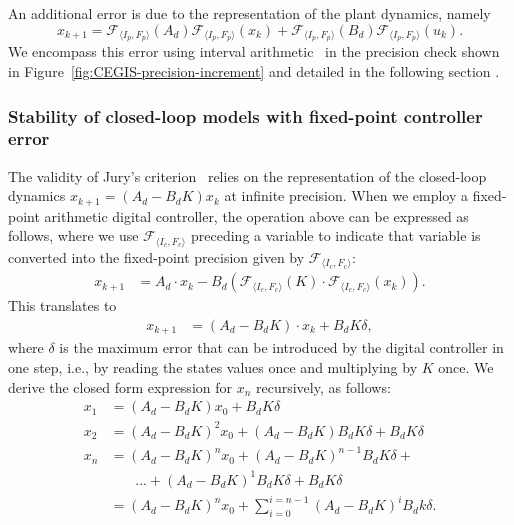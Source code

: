 An additional error is due to the representation of the plant dynamics, namely 
%
{\scriptsize
\begin{equation*}
x_{k+1} =\mathcal{F}_{\langle I_p,F_p \rangle}(A_d) \mathcal{F}_{\langle I_p,F_p \rangle}(x_{k}) + \mathcal{F}_{\langle I_p,F_p \rangle}(B_d)\mathcal{F}_{\langle I_p,F_p \rangle}(u_{k}).
\end{equation*}
}
We encompass this error using interval arithmetic~\cite{moore1966interval} in the precision check shown in Figure~\ref{fig:CEGIS-precision-increment} and detailed in the following section .


\subsubsection{Stability of closed-loop models with fixed-point controller error}
\label{sec:stab_FWL}
The validity of Jury's criterion~\cite{fadali} relies on the representation of the closed-loop dynamics $x_{k+1} = (A_d - B_dK) x_k$ at infinite precision.  
When we employ a fixed-point arithmetic digital controller, the operation above can be expressed as follows, where we use $\mathcal{F}_{\langle I_c,F_c \rangle}$ preceding a variable to indicate that variable is converted into the fixed-point precision given by $\mathcal{F}_{\langle I_c,F_c \rangle}$: 
%
\begin{align*}
x_{k+1} &= A_d \cdot x_{k} -B_d(\mathcal{F}_{\langle I_c,F_c \rangle}(K)\cdot\mathcal{F}_{\langle I_c,F_c \rangle}(x_{k})).  
\end{align*}
This translates to 
\begin{align*}
x_{k+1} &= (A_d  - B_dK) \cdot x_k + B_dK\delta, 
\end{align*}
%
where $\delta$ is the maximum error that can be introduced by the digital controller in one step, 
i.e., by reading the states values once and multiplying by $K$ once.  
We derive the closed form expression for $x_n$ recursively, as follows:
%
\small
\begin{align*}
x_{1} &= (A_d  - B_dK)x_0 + B_dK\delta \\
x_{2} %
 &=(A_d  - B_dK)^2x_0 + (A_d  - B_dK)B_dK\delta + B_dK\delta \\
x_{n} &= (A_d  - B_dK)^nx_0 + (A_d  - B_dK)^{n-1}B_dK\delta +\\
&\phantom{{}=1} ... + (A_d  - B_dK)^1B_dK \delta + B_dK\delta \\
  &= (A_d - B_dK)^nx_0 + \sum_{i=0}^{i=n-1}(A_d - B_dK)^iB_dk\delta. 
\end{align*}
